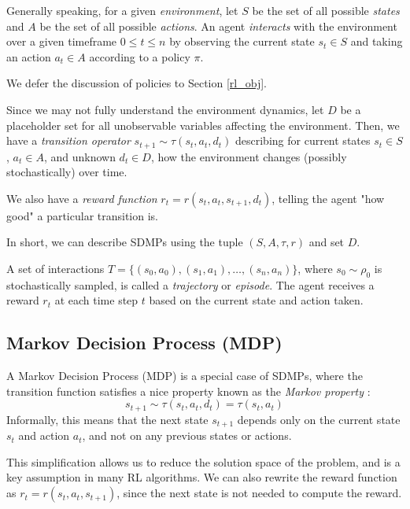 \documentclass{article} %
\begin{document}
Generally speaking, for a given \textit{environment}, let $S$ be the set of all possible \textit{states}
and $A$ be the set of all possible \textit{actions}. An agent \textit{interacts} with the environment over a given timeframe 
$0 \leq t \leq n$ by observing the current state $s_t \in S$ and taking an action $a_t \in A$ according to a policy $\pi$.

We defer the discussion of policies to Section \ref{rl_obj}.

Since we may not fully understand the environment dynamics, 
let $D$ be a placeholder set for all unobservable variables affecting the environment.
Then, we have a \textit{transition operator} $s_{t+1} \sim \tau(s_t, a_t, d_t)$ 
describing for current states $s_t \in S$, $a_t \in A$, and unknown $d_t \in D$,
how the environment changes (possibly stochastically) over time.

We also have a \textit{reward function} $r_t = r(s_t, a_t, s_{t + 1}, d_t)$, 
telling the agent "how good" a particular transition is.

In short, we can describe SDMPs using the tuple $(S, A, \tau, r)$ and set $D$.

A set of interactions $T = \{(s_0, a_0), (s_1, a_1), \ldots, (s_n, a_n)\}$, where $s_0 \sim \rho_0$ is stochastically sampled, is called a \textit{trajectory} or \textit{episode}. 
The agent receives a reward $r_t$ at each time step $t$ based on the current state and action taken.

\subsection{Markov Decision Process (MDP)}
A Markov Decision Process (MDP) is a special case of SDMPs, where the transition function satisfies
a nice property known as the \textit{Markov property} \cite{Sutton-and-Barto-1998}:
\begin{equation} \label{markov_property}
    s_{t+1} \sim \tau(s_t, a_t, d_t) = \tau(s_t, a_t)
\end{equation}
Informally, this means that the next state $s_{t+1}$ depends only on the current state $s_t$ and action $a_t$, and not on any previous states or actions.

This simplification allows us to reduce the solution space of the problem, and is a key assumption in many RL algorithms.
We can also rewrite the reward function as $r_t = r(s_t, a_t, s_{t + 1})$, since the next state is not needed to compute the reward.
\end{document}
